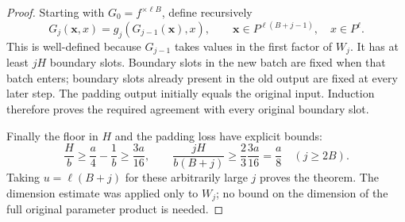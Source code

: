 \begin{proof}
Starting with $G_0=f^{\times\ell B}$, define recursively
\[
 G_j(\mathbf x,x)=g_j(G_{j-1}(\mathbf x),x),
 \qquad
 \mathbf x\in P^{\ell(B+j-1)},\quad x\in P^\ell.
\]
This is well-defined because $G_{j-1}$ takes values in the first
factor of $W_j$.  It has at least $jH$ boundary slots.  Boundary slots
in the new batch are fixed when that batch enters; boundary slots
already present in the old output are fixed at every later step.
The padding output initially equals the original input.  Induction
therefore proves the required agreement with every original boundary
slot.

Finally the floor in $H$ and the padding loss have explicit bounds:
\[
 \frac Hb\ge\frac a4-\frac1b\ge\frac{3a}{16},
 \qquad
 \frac{jH}{b(B+j)}
       \ge\frac23\frac{3a}{16}=\frac a8
       \quad(j\ge2B).
\]
Taking $u=\ell(B+j)$ for these arbitrarily large $j$ proves the
theorem.  The dimension estimate was applied only to $W_j$; no bound
on the dimension of the full original parameter product is needed.
\end{proof}

